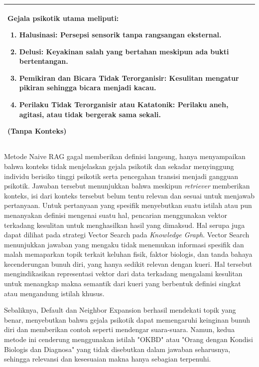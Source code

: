 \begin{longtable}{|p{2cm}|p{11cm}|}
\begin{minipage}[t]{10cm}
		Gejala psikotik utama meliputi:
		\begin{enumerate}
			\item \textbf{Halusinasi:} Persepsi sensorik tanpa rangsangan eksternal.
			\item \textbf{Delusi:} Keyakinan salah yang bertahan meskipun ada bukti bertentangan.
			\item \textbf{Pemikiran dan Bicara Tidak Terorganisir:} Kesulitan mengatur pikiran sehingga bicara menjadi kacau.
			\item \textbf{Perilaku Tidak Terorganisir atau Katatonik:} Perilaku aneh, agitasi, atau tidak bergerak sama sekali.
		\end{enumerate}
		(\textbf{Tanpa Konteks})
		\vspace{0.5em}
	\end{minipage}                                                                                                                                          \\
	\hline
\end{longtable}

Metode Naive RAG gagal memberikan definisi langsung, hanya menyampaikan bahwa konteks tidak menjelaskan gejala psikotik dan sekadar menyinggung individu berisiko tinggi psikotik serta pencegahan transisi menjadi gangguan psikotik.
Jawaban tersebut menunjukkan bahwa meskipun \textit{retriever} memberikan konteks, isi dari konteks tersebut belum tentu relevan dan sesuai untuk menjawab pertanyaan.
Untuk pertanyaan yang spesifik menyebutkan suatu istilah atau pun menanyakan definisi mengenai suatu hal, pencarian menggunakan vektor terkadang kesulitan untuk menghasilkan hasil yang dimaksud.
Hal serupa juga dapat dilihat pada strategi Vector Search pada \textit{Knowledge Graph}.
Vector Search menunjukkan jawaban yang mengaku tidak menemukan informasi spesifik dan malah memaparkan topik terkait keluhan fisik, faktor biologis, dan tanda bahaya kecenderungan bunuh diri, yang hanya sedikit relevan dengan kueri.
Hal tersebut mengindikasikan representasi vektor dari data terkadang mengalami kesulitan untuk menangkap makna semantik dari kueri yang berbentuk definisi singkat atau mengandung istilah khusus.

Sebaliknya, Default dan Neighbor Expansion berhasil mendekati topik yang benar, menyebutkan bahwa gejala psikotik dapat memengaruhi keinginan bunuh diri dan memberikan contoh seperti mendengar suara-suara.
Namun, kedua metode ini cenderung menggunakan istilah "OKBD" atau "Orang dengan Kondisi Biologis dan Diagnosa" yang tidak disebutkan dalam jawaban seharusnya, sehingga relevansi dan kesesuaian makna hanya sebagian terpenuhi.

